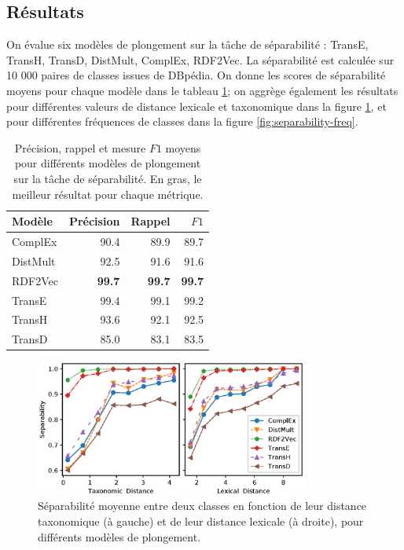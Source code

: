 \subsection{Résultats}

On évalue six modèles de plongement sur la tâche de séparabilité : TransE, TransH, TransD, DistMult, ComplEx, RDF2Vec. La séparabilité est calculée sur 10 000 paires de classes issues de DBpédia. On donne les scores de séparabilité moyens pour chaque modèle dans le tableau \ref{tab:separability-results}; on aggrège également les résultats pour différentes valeurs de distance lexicale et taxonomique dans la figure \ref{fig:separability-lexical}, et pour différentes fréquences de classes dans la figure \ref{fig:separability-freq}.


\begin{table}[ht]
    \centering
    \caption[Séparabilité moyenne de différents modèles de plongement]{Précision, rappel et mesure $F1$ moyens pour différents modèles de plongement sur la tâche de séparabilité. En gras, le meilleur résultat pour chaque métrique.}
    \begin{tabular}{|lrrr|}
    \hline 
        Modèle     & Précision  & Rappel & $F1$ \\
        \hline 
        ComplEx   &	90.4	&	89.9	&	89.7 \\
        DistMult  &	92.5	&	91.6	&	91.6 \\
        RDF2Vec   &	\textbf{99.7}	&	\textbf{99.7}	&	\textbf{99.7} \\
        TransE    &	99.4	&	99.1	&	99.2 \\
        TransH    &	93.6	&	92.1	&	92.5 \\
        TransD    &	85.0	&	83.1	&	83.5 \\
        \hline
    \end{tabular}
    \label{tab:separability-results}
\end{table}

\begin{figure}[h]
  \centering
  \includegraphics[width=0.8\textwidth]{fig/plot/sep1_dist.eps}
  \caption[Séparabilité moyenne en fonction de la distance entre classes]{Séparabilité moyenne entre deux classes en fonction de leur distance taxonomique (à gauche) et de leur distance lexicale (à droite), pour différents modèles de plongement. }
  \label{fig:separability-lexical}
\end{figure}

